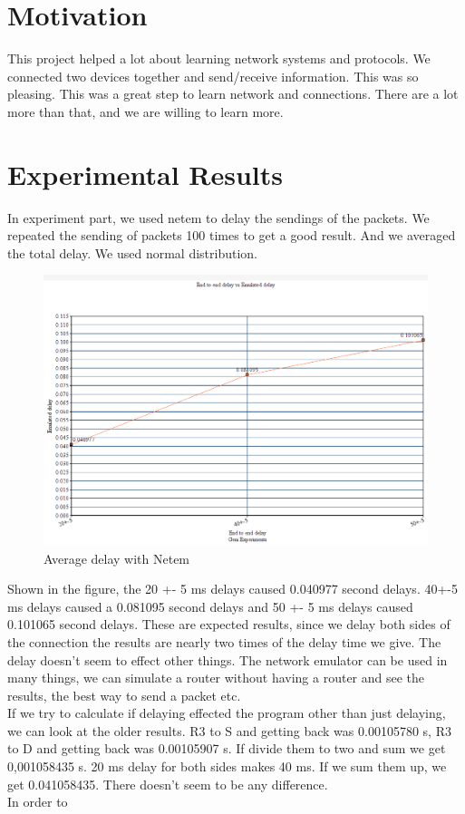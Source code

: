 \documentclass[conference]{IEEEtran}
\begin{document}
\section{Motivation}
This project helped a lot about learning network systems and protocols. We connected two devices together and send/receive information. This was so pleasing. This was a great step to learn network and connections. There are a lot more than that, and we are willing to learn more.
\section{Experimental Results}
In experiment part, we used netem to delay the sendings of the packets. We repeated the sending of packets 100 times to get a good result. And we averaged the total delay. We used normal distribution.
\begin{figure}
    \centering
    \includegraphics[scale=0.62]{Delaysandresults.png}
    \caption{Average delay with Netem}
\end{figure}

Shown in the figure, the 20 +- 5 ms delays caused 0.040977 second delays. 40+-5 ms delays caused a 0.081095 second delays and 50 +- 5 ms delays caused 0.101065 second delays. These are expected results, since we delay both sides of the connection the results are nearly two times of the delay time we give. The delay doesn't seem to effect other things. The network emulator can be used in many things, we can simulate a router without having a router and see the results, the best way to send a packet etc.\\
If we try to calculate if delaying effected the program other than just delaying, we can look at the older results. R3 to S and getting back was 0.00105780 s, R3 to D and getting back was 0.00105907 s. If divide them to two and sum we get 0,001058435 s. 20 ms delay for both sides makes 40 ms. If we sum them up, we get 0.041058435. There doesn't seem to be any difference. \\
In order to 
\end{document}
